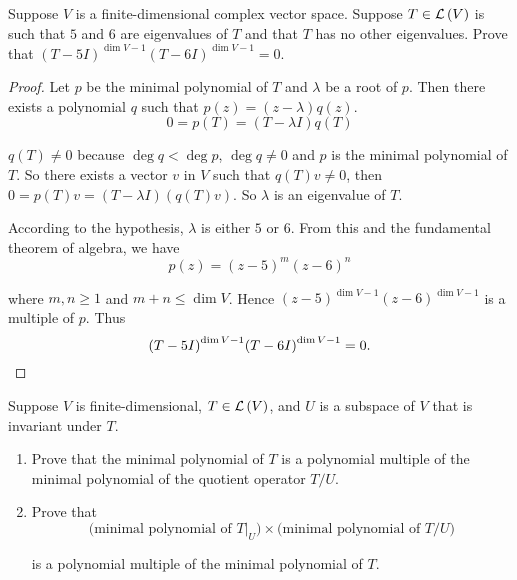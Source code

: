 \begin{exercise}
    Suppose $V$ is a finite-dimensional complex vector space. Suppose $T\in\mathcal{L}\left({V}\right)$ is such that $5$ and $6$ are eigenvalues of $T$ and that $T$ has no other eigenvalues. Prove that ${(T - 5I)}^{\dim V - 1}{(T - 6I)}^{\dim V - 1} = 0$.
\end{exercise}

\begin{proof}
    Let $p$ be the minimal polynomial of $T$ and $\lambda$ be a root of $p$. Then there exists a polynomial $q$ such that $p(z) = (z - \lambda)q(z)$.
    \[
        0 = p(T) = (T - \lambda I)q(T)
    \]

    $q(T)\ne 0$ because $\deg q < \deg p$, $\deg q\ne 0$ and $p$ is the minimal polynomial of $T$. So there exists a vector $v$ in $V$ such that $q(T)v\ne 0$, then $0 = p(T)v = (T - \lambda I)(q(T)v)$. So $\lambda$ is an eigenvalue of $T$.

    According to the hypothesis, $\lambda$ is either $5$ or $6$. From this and the fundamental theorem of algebra, we have
    \[
        p(z) = {(z - 5)}^{m}{(z - 6)}^{n}
    \]

    where $m, n\geq 1$ and $m + n \leq \dim V$. Hence ${(z - 5)}^{\dim V - 1}{(z - 6)}^{\dim V - 1}$ is a multiple of $p$. Thus
    \[
        {(T - 5I)}^{\dim V - 1}{(T - 6I)}^{\dim V - 1} = 0.\qedhere
    \]
\end{proof}
\newpage

\begin{exercise}
    Suppose $V$ is finite-dimensional, $T\in\mathcal{L}\left({V}\right)$, and $U$ is a subspace of $V$ that is invariant under $T$.
    \begin{enumerate}[label={(\alph*)}]
        \item Prove that the minimal polynomial of $T$ is a polynomial multiple of the minimal polynomial of the quotient operator $T/U$.
        \item Prove that
              \[
                  \text{(minimal polynomial of $T\vert_{U}$)}\times\text{(minimal polynomial of $T/U$)}
              \]

              is a polynomial multiple of the minimal polynomial of $T$.
    \end{enumerate}
\end{exercise}

